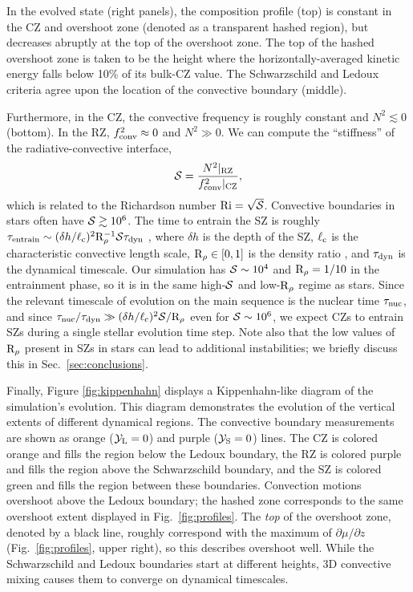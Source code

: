 In the evolved state (right panels), the composition profile (top) is constant in the CZ and overshoot zone (denoted as a transparent hashed region), but decreases abruptly at the top of the overshoot zone.
The top of the hashed overshoot zone is taken to be the height where the horizontally-averaged kinetic energy falls below 10\% of its bulk-CZ value.
The Schwarzschild and Ledoux criteria agree upon the location of the convective boundary (middle).

Furthermore, in the CZ, the convective frequency is roughly constant and $N^2 \lesssim 0$ (bottom).
In the RZ, $f_{\rm{conv}}^2 \approx 0$ and $N^2 \gg 0$.
We can compute the ``stiffness'' of the radiative-convective interface,
\begin{equation}
\mS = \frac{N^2|_{\rm{RZ}}}{f_{\rm{conv}}^2|_{\rm{CZ}}},
\label{eqn:stiffness}
\end{equation}
which is related to the Richardson number $\rm{Ri} = \sqrt{\mathcal{S}}$.
Convective boundaries in stars often have $\mathcal{S} \gtrsim 10^6$.
The time to entrain the SZ is roughly ${\tau_{\rm{entrain}} \sim (\delta h / \ell_{\rm{c}})^2 \rm{R}_{\rho}^{-1} \mathcal{S} \tau_{\rm{dyn}}}$ \citep[per][eqn.~3]{fuentes_cumming_2020}, where $\delta h$ is the depth of the SZ, $\ell_{\rm{c}}$ is the characteristic convective length scale, $\mathrm{R}_{\rho} \in [0, 1]$ is the density ratio \citep[see][eqn.~7]{garaud_2018}, and $\tau_{\rm{dyn}}$ is the dynamical timescale.
Our simulation has $\mathcal{S} \sim 10^{4}$ and $\rm{R}_\rho = 1/10$ in the entrainment phase, so it is in the same high-$\mathcal{S}$ and low-$\rm{R}_\rho$ regime as stars.
Since the relevant timescale of evolution on the main sequence is the nuclear time $\tau_{\rm{nuc}}$, and since $\tau_{\rm{nuc}}/\tau_{\rm{dyn}} \gg (\delta h/\ell_{\rm{c}})^2 \mathcal{S}/\mathrm{R}_{\rho}$ even for $\mathcal{S} \sim 10^6$, we expect CZs to entrain SZs during a single stellar evolution time step.
Note also that the low values of $\mathrm{R}_{\rho}$ present in SZs in stars can lead to additional instabilities; we briefly discuss this in Sec.~\ref{sec:conclusions}.

Finally, Figure \ref{fig:kippenhahn} displays a Kippenhahn-like diagram of the simulation's evolution.
This diagram demonstrates the evolution of the vertical extents of different dynamical regions.
The convective boundary measurements are shown as orange ($\mathcal{Y}_{\rm{L}} = 0$) and purple ($\mathcal{Y}_{\rm{S}} = 0$) lines.
The CZ is colored orange and fills the region below the Ledoux boundary, the RZ is colored purple and fills the region above the Schwarzschild boundary, and the SZ is colored green and fills the region between these boundaries.
Convection motions overshoot above the Ledoux boundary; the hashed zone corresponds to the same overshoot extent displayed in Fig.~\ref{fig:profiles}.
The \emph{top} of the overshoot zone, denoted by a black line, roughly correspond with the maximum of $\partial\mu/\partial z$ (Fig.~\ref{fig:profiles}, upper right), so this describes overshoot well.
While the Schwarzschild and Ledoux boundaries start at different heights, 3D convective mixing causes them to converge on dynamical timescales.


